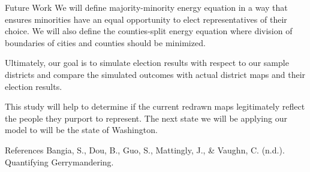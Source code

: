 \documentclass[leqno, handout]{beamer}
\theoremstyle{definition}
\begin{document}
\begin{frame}
\begin{columns}[t]
\begin{column}{.25\linewidth}
\begin{block}{Future Work}
We will define majority-minority energy equation in a way that ensures minorities have an equal opportunity to elect representatives of their choice. We will also define the counties-split energy equation where division of boundaries of cities and counties should be minimized. 

Ultimately, our goal is to simulate election results with respect to our sample districts
and compare the simulated outcomes with actual district maps and their
election results.

This study will help to determine if the current redrawn maps legitimately reflect the people they purport to represent. The next state we will be applying our model to will be the state of Washington.
\end{block}

\begin{block}{References}
Bangia, S., Dou, B., Guo, S., Mattingly, J., \& Vaughn, C. (n.d.). Quantifying Gerrymandering.


\end{block}

\end{column}

\end{columns}

\vfill

  \begin{block}{}
   \begin{center}
  \end{center}
  \end{block}



\end{frame}
\end{document}
